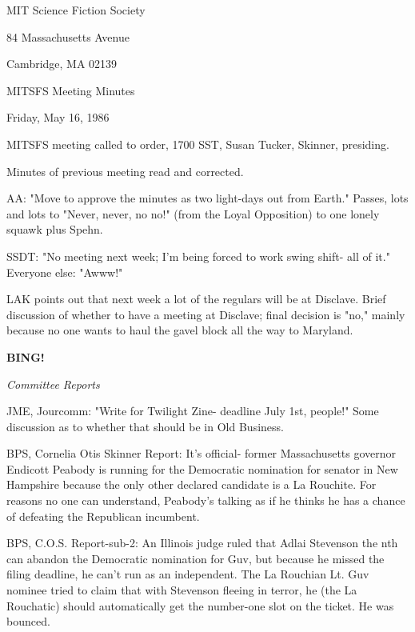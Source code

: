 \documentclass[12pt]{article}
\newcommand{\bing}{{\bf BING!} }
\newcommand{\goto}[1]{\bing \vskip 12pt \centerline{{\em{#1}}}}
\begin{document}
\begin{center}

MIT Science Fiction Society 

84 Massachusetts Avenue

Cambridge, MA 02139

\vspace{12pt}

MITSFS Meeting Minutes 

Friday, May 16, 1986

\end{center}
 
\vspace{18pt}

\setlength{\parskip}{6pt}

\noindent
MITSFS meeting called to order, 1700 SST,
Susan Tucker, Skinner, presiding.

Minutes of previous meeting read and corrected.

AA: "Move to approve the minutes as two light-days out from Earth." Passes, lots and lots to "Never, never, no no!" (from the Loyal Opposition) to one lonely squawk plus Spehn.

SSDT: "No meeting next week; I'm being forced to work swing shift- all of it." Everyone else: "Awww!"

LAK points out that next week a lot of the regulars will be at Disclave. Brief discussion of whether to have a meeting at Disclave; final decision is "no," mainly because no one wants to haul the gavel block all the way to Maryland.

\goto{Committee Reports}

JME, Jourcomm: "Write for Twilight Zine- deadline July 1st, people!" Some discussion as to whether that should be in Old Business.

BPS, Cornelia Otis Skinner Report: It's official- former Massachusetts governor Endicott Peabody is running for the Democratic nomination for senator in New Hampshire because the only other declared candidate is a La Rouchite. For reasons no one can understand, Peabody's talking as if he thinks he has a chance of defeating the Republican incumbent.

BPS, C.O.S. Report-sub-2: An Illinois judge ruled that Adlai Stevenson the nth can abandon the Democratic nomination for Guv, but because he missed the filing deadline, he can't run as an independent. The La Rouchian Lt. Guv nominee tried to claim that with Stevenson fleeing in terror, he (the La Rouchatic) should automatically get the number-one slot on the ticket. He was bounced.
\end{document}
